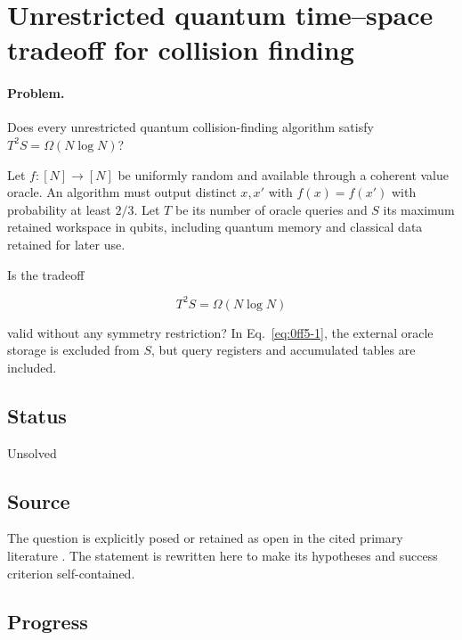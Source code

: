 \section{Unrestricted quantum time--space tradeoff for collision finding}
\label{sec:op_0ff53a57552ddd7f}

\paragraph{Problem.}
Does every unrestricted quantum collision-finding algorithm satisfy $T^2S=\Omega(N\log N)$?

Let $f:[N]\to[N]$ be uniformly random and available through a coherent value oracle. An algorithm must output distinct $x,x'$ with $f(x)=f(x')$ with probability at least $2/3$. Let $T$ be its number of oracle queries and $S$ its maximum retained workspace in qubits, including quantum memory and classical data retained for later use.

Is the tradeoff

\begin{equation}
T^2S=\Omega(N\log N)
\label{eq:0ff5-1}
\end{equation}

valid without any symmetry restriction? In Eq.~\eqref{eq:0ff5-1}, the external oracle storage is excluded from $S$, but query registers and accumulated tables are included.

\subsection*{Status}

Unsolved

\subsection*{Source}

The question is explicitly posed or retained as open in the cited primary literature .  The statement is rewritten here to make its hypotheses and success criterion self-contained.

\subsection*{Progress}

